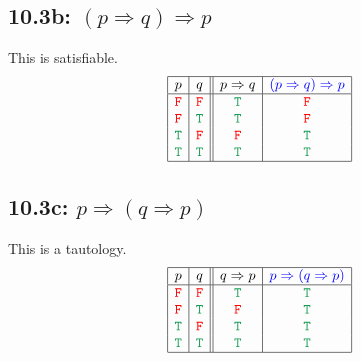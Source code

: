 \documentclass{article}
\begin{document}
\subsection*{10.3b: $(p\Rightarrow q)\Rightarrow p$}
This is satisfiable.
\[\begin{array}{|c|c||c|c|}
\hline
p&q&p\Rightarrow q&\textcolor{blue}{(p\Rightarrow q)\Rightarrow p}\\
\hline
\textcolor{red}{\tt{F}}&\textcolor{red}{\tt{F}}&\textcolor{ForestGreen}{\tt{T}}&\textcolor{red}{\tt{F}}\\
\textcolor{red}{\tt{F}}&\textcolor{ForestGreen}{\tt{T}}&\textcolor{ForestGreen}{\tt{T}}&\textcolor{red}{\tt{F}}\\
\textcolor{ForestGreen}{\tt{T}}&\textcolor{red}{\tt{F}}&\textcolor{red}{\tt{F}}&\textcolor{ForestGreen}{\tt{T}}\\
\textcolor{ForestGreen}{\tt{T}}&\textcolor{ForestGreen}{\tt{T}}&\textcolor{ForestGreen}{\tt{T}}&\textcolor{ForestGreen}{\tt{T}}\\
\hline
\end{array}\]
\subsection*{10.3c: $p\Rightarrow(q\Rightarrow p)$}
This is a tautology.
\[\begin{array}{|c|c||c|c|}
\hline
p&q&q\Rightarrow p&\textcolor{blue}{p\Rightarrow(q\Rightarrow p)}\\
\hline
\textcolor{red}{\tt{F}}&\textcolor{red}{\tt{F}}&\textcolor{ForestGreen}{\tt{T}}&\textcolor{ForestGreen}{\tt{T}}\\
\textcolor{red}{\tt{F}}&\textcolor{ForestGreen}{\tt{T}}&\textcolor{red}{\tt{F}}&\textcolor{ForestGreen}{\tt{T}}\\
\textcolor{ForestGreen}{\tt{T}}&\textcolor{red}{\tt{F}}&\textcolor{ForestGreen}{\tt{T}}&\textcolor{ForestGreen}{\tt{T}}\\
\textcolor{ForestGreen}{\tt{T}}&\textcolor{ForestGreen}{\tt{T}}&\textcolor{ForestGreen}{\tt{T}}&\textcolor{ForestGreen}{\tt{T}}\\
\hline
\end{array}\]
\end{document}
